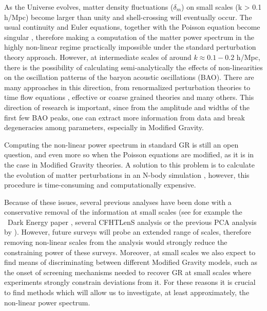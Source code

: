As the Universe evolves, matter density fluctuations
($\delta_{m}$) on small scales (k > 0.1 h/Mpc) become larger than unity and shell-crossing will eventually occur. The usual continuity and
Euler equations, together with the Poisson equation become singular
\cite{bernardeau_large-scale_2001,bernardeau_evolution_2013},
therefore making a computation of the matter power spectrum in the
highly non-linear regime practically impossible under the standard
perturbation theory approach. However, at intermediate scales of around
$k\approx0.1-0.2$ h/Mpc, there is the possibility of calculating
semi-analytically the effects of non-linearities on the oscillation
patterns of the baryon acoustic oscillations (BAO). There are many
approaches in this direction, from renormalized perturbation theories
\cite{crocce_renormalized_2006,blas_time-sliced_2016,taruya_closure_2008}
to time flow equations \cite{pietroni_flowing_2008,anselmi_nonlinear_2012}, effective or coarse grained theories
\cite{carrasco_effective_2012,baumann_cosmological_2012,pietroni_coarse-grained_2011,manzotti_coarse_2014} and many others.
 This direction of research is important, since from the
amplitude and widths of the first few BAO peaks, one can extract more information from data and break degeneracies among parameters, especially in Modified Gravity.

Computing the non-linear power spectrum in standard GR is still an
open question, and even more so when the Poisson equations are modified,
as it is in the case in Modified Gravity theories. A solution to this problem
is to calculate the evolution of matter perturbations in an N-body
simulation
\cite{springel_cosmological_2005,fosalba_mice_2013,takahashi_revising_2012,lawrence_coyote_2010,heitmann_coyote_2014},
however, this procedure is time-consuming and computationally expensive.

Because of these issues, several previous analyses
have been done with a conservative removal of the information at small
scales (see for example the \planck\ Dark Energy paper
\cite{planck_collaboration_planck_2016},
several CFHTLenS analysis \cite{heymans_cfhtlens_2013,kitching_3d_2014}
or the previous PCA analysis by \cite{hojjati_cosmological_2012}).
However, future surveys will probe an extended range of scales, therefore
removing non-linear scales from the analysis would strongly reduce
the constraining power of these surveys. Moreover, at small scales
we also expect to find means of discriminating between different Modified
Gravity models, such as the onset of screening mechanisms needed to
recover GR at small scales where experiments strongly constrain
deviations from it. For these reasons it is crucial to find methods
which will allow us to investigate, at least approximately, the non-linear
power spectrum.

